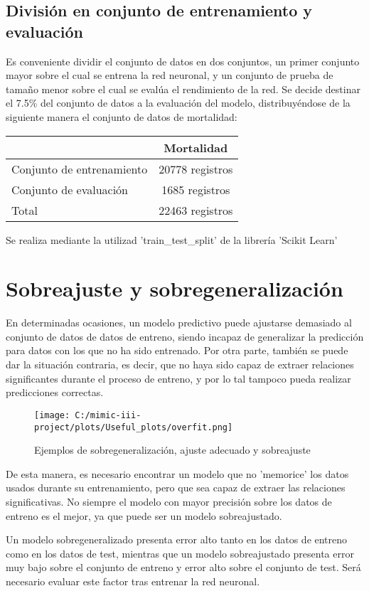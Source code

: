 \documentclass{report}
\begin{document}
\subsection{División en conjunto de entrenamiento y
evaluación}

Es conveniente dividir el conjunto de datos en dos conjuntos, un primer
conjunto mayor sobre el cual se entrena la red neuronal, y un conjunto
de prueba de tamaño menor sobre el cual se evalúa el rendimiento de la
red.
Se decide destinar el 7.5\% del conjunto de datos a la evaluación del
modelo, distribuyéndose de la siguiente manera el conjunto de datos de
mortalidad:

\begin{longtable}[]{@{}lc@{}}
\toprule
& Mortalidad\tabularnewline
\midrule
\endhead
Conjunto de entrenamiento & 20778 registros\tabularnewline
Conjunto de evaluación & 1685 registros\tabularnewline
Total & 22463 registros\tabularnewline
\bottomrule
\end{longtable}

Se realiza mediante la utilizad 'train\_test\_split' de la
librería 'Scikit Learn'

\newpage
\section{Sobreajuste y sobregeneralización}
En determinadas ocasiones, un modelo predictivo puede ajustarse
demasiado al conjunto de datos de datos de entreno, siendo incapaz de
generalizar la predicción para datos con los que no ha sido entrenado.
Por otra parte, también se puede dar la situación contraria, es decir,
que no haya sido capaz de extraer relaciones significantes durante el
proceso de entreno, y por lo tal tampoco pueda realizar predicciones
correctas.

\begin{figure}[h]
\centering
\texttt{[image: C:/mimic-iii-project/plots/Useful\_plots/overfit.png]}
\caption{Ejemplos de sobregeneralización, ajuste adecuado y sobreajuste}
\end{figure}

De esta manera, es necesario encontrar un modelo que no 'memorice' los
datos usados durante su entrenamiento, pero que sea capaz de extraer las
relaciones significativas. No siempre el modelo con mayor precisión
sobre los datos de entreno es el mejor, ya que puede ser un modelo
sobreajustado.

Un modelo sobregeneralizado presenta error alto tanto en los datos de
entreno como en los datos de test, mientras que un modelo sobreajustado
presenta error muy bajo sobre el conjunto de entreno y error alto sobre
el conjunto de test. Será necesario evaluar este factor tras entrenar la red neuronal.
\end{document}
